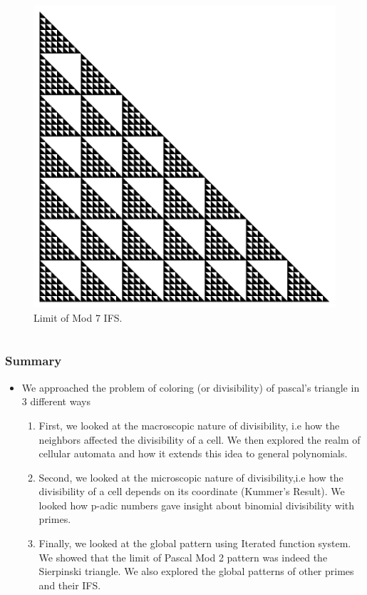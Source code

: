 \documentclass{beamer}
\begin{document}
\begin{frame}
    \begin{figure}
        \centering
        \includegraphics[scale=0.5]{GlobalMod7}
        \caption{Limit of Mod 7 IFS.}
    \end{figure}
\end{frame}

\section*{}
\begin{frame}
    \frametitle{Summary}
    \begin{itemize}
        \item We approached the problem of coloring (or divisibility) of pascal's triangle in 3 different ways 
        \begin{enumerate}
            \item First, we looked at the macroscopic nature of divisibility, i.e how the neighbors affected the divisibility of a cell. We then explored the realm of cellular automata and how it extends this idea to general polynomials.
            \item Second, we looked at the microscopic nature of divisibility,i.e how the divisibility of a cell depends on its coordinate (Kummer's Result). We looked how p-adic numbers gave insight about binomial divisibility with primes.
            \item Finally, we looked at the global pattern using Iterated function system. We showed that the limit of Pascal Mod 2 pattern was indeed the Sierpinski triangle. We also explored the global patterns of other primes and their IFS. 
        \end{enumerate}
    \end{itemize}
\end{frame}
\end{document}
